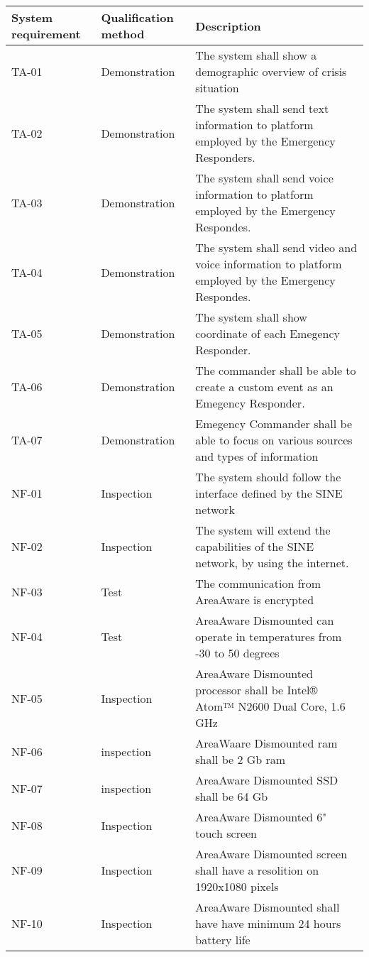 \begin{longtable}{| p{2.4cm}  | p{2.6cm} | p{6.6cm} |  }
	\hline
	\textbf{System requirement}	& \textbf{Qualification method} & \textbf{Description} \\ \hline
	TA-01	& Demonstration	& The system shall show a demographic overview of crisis situation \\ \hline
	TA-02	& Demonstration	& The system shall send text information to platform employed by the Emergency Responders. \\ \hline
	TA-03	& Demonstration	& The system shall send voice information to platform employed by the Emergency Respondes. \\ \hline
	TA-04	& Demonstration	& The system shall send video and voice information to platform employed by the Emergency Respondes.\\ \hline
	TA-05	& Demonstration	& The system shall show coordinate of each Emegency Responder. \\ \hline
	TA-06	& Demonstration	& The commander shall be able to create a custom event as an Emegency Responder. \\ \hline
	TA-07	& Demonstration	& Emegency Commander shall be able to focus on various sources and types of information \\ \hline
	NF-01	& Inspection	& The system should follow the interface defined by the SINE network \\ \hline
	NF-02	& Inspection	& The system will extend the capabilities of the SINE network, by using the internet. \\ \hline
	NF-03	& Test			& The communication from AreaAware is encrypted  \\ \hline
	NF-04	& Test			& AreaAware Dismounted can operate in temperatures from -30 to 50 degrees \\ \hline
	NF-05	& Inspection	& AreaAware Dismounted processor shall be Intel® Atom™ N2600 Dual Core, 1.6 GHz \\ \hline
	NF-06	& inspection	& AreaWaare Dismounted ram shall be 2 Gb ram \\ \hline
	NF-07	& inspection	& AreaAware Dismounted SSD shall be 64 Gb \\ \hline
	NF-08	& Inspection	& AreaAware Dismounted 6" touch screen \\ \hline
	NF-09	& Inspection	& AreaAware Dismounted screen shall have a resolition on 1920x1080 pixels  \\ \hline
	NF-10	& Inspection	& AreaAware Dismounted shall have have minimum 24 hours battery life \\ \hline

\end{longtable}
